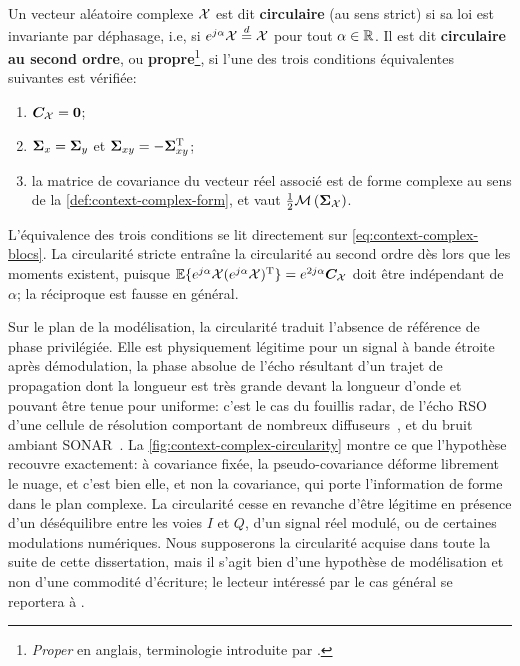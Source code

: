 \begin{definition}[{Circularité}]
\label{def:context-complex-circularity}
  Un vecteur aléatoire complexe $\mathcal{X}$ est dit \textbf{circulaire} (au sens strict) si sa loi est invariante par déphasage, i.e, si $e^{j\alpha}\mathcal{X}\overset{d}{=}\mathcal{X}$ pour tout $\alpha\in\mathbb{R}$. Il est dit \textbf{circulaire au second ordre}, ou \textbf{propre}\footnote{\emph{Proper} en anglais, terminologie introduite par .}, si l'une des trois conditions équivalentes suivantes est vérifiée:
  \begin{enumerate}
    \item $\boldsymbol{C}_{\mathcal{X}} = \boldsymbol{0}$;
    \item $\boldsymbol{\Sigma}_x = \boldsymbol{\Sigma}_y$ et $\boldsymbol{\Sigma}_{xy} = -\boldsymbol{\Sigma}_{xy}^{\mathrm{T}}$;
    \item la matrice de covariance du vecteur réel associé est de forme complexe au sens de la \cref{def:context-complex-form}, et vaut $\frac12\mathcal{M}\left(\boldsymbol{\Sigma}_{\mathcal{X}}\right)$.
  \end{enumerate}
\end{definition}

\begin{remark}
  L'équivalence des trois conditions se lit directement sur \cref{eq:context-complex-blocs}. La circularité stricte entraîne la circularité au second ordre dès lors que les moments existent, puisque $\operatorname{\mathbb{E}}\{e^{j\alpha}\mathcal{X}(e^{j\alpha}\mathcal{X})^{\mathrm{T}}\} = e^{2j\alpha}\boldsymbol{C}_{\mathcal{X}}$ doit être indépendant de $\alpha$; la réciproque est fausse en général.
\end{remark}

  Sur le plan de la modélisation, la circularité traduit l'absence de référence de phase privilégiée. Elle est physiquement légitime pour un signal à bande étroite après démodulation, la phase absolue de l'écho résultant d'un trajet de propagation dont la longueur est très grande devant la longueur d'onde et pouvant être tenue pour uniforme: c'est le cas du fouillis radar, de l'écho RSO d'une cellule de résolution comportant de nombreux diffuseurs~, et du bruit ambiant SONAR~. La \cref{fig:context-complex-circularity} montre ce que l'hypothèse recouvre exactement: à covariance fixée, la pseudo-covariance déforme librement le nuage, et c'est bien elle, et non la covariance, qui porte l'information de forme dans le plan complexe. La circularité cesse en revanche d'être légitime en présence d'un déséquilibre entre les voies $I$ et $Q$, d'un signal réel modulé, ou de certaines modulations numériques. Nous supposerons la circularité acquise dans toute la suite de cette dissertation, mais il s'agit bien d'une hypothèse de modélisation et non d'une commodité d'écriture; le lecteur intéressé par le cas général se reportera à .


